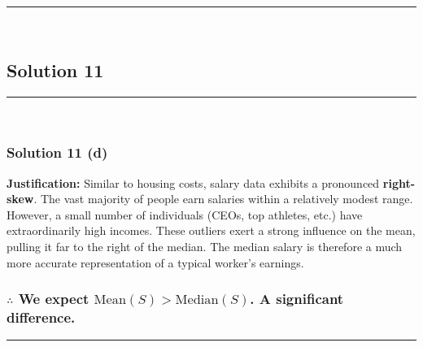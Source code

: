 \documentclass{article}
\begin{document}
\noindent\rule{\textwidth}{0.4pt}\\

\newpage

\subsection*{Solution 11}
\noindent\rule{\textwidth}{0.4pt}\\
\subsubsection*{Solution  11 (d)}

\parbox{\textwidth}{
    \textbf{Justification:} Similar to housing costs, salary data exhibits a pronounced \textbf{right-skew}. The vast majority of people earn salaries within a relatively modest range. However, a small number of individuals (CEOs, top athletes, etc.) have extraordinarily high incomes. These outliers exert a strong influence on the mean, pulling it far to the right of the median. The median salary is therefore a much more accurate representation of a typical worker's earnings.
}
\vspace{1em}
\subsubsection*{\normalfont $\therefore$ We expect $\text{Mean}(S) > \text{Median}(S)$. A significant difference.}


\noindent\rule{\textwidth}{0.4pt}\\

\newpage
\end{document}
